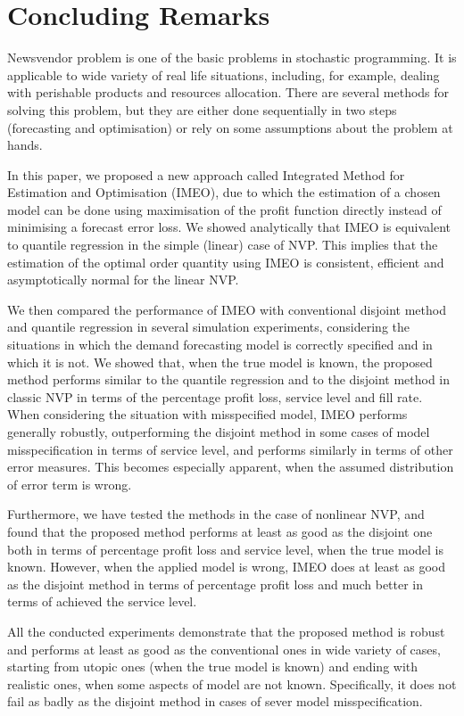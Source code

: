 \documentclass{article}
\begin{document}
\section{Concluding Remarks} \label{se:end}

Newsvendor problem is one of the basic problems in stochastic programming. It is applicable to wide variety of real life situations, including, for example, dealing with perishable products and resources allocation. There are several methods for solving this problem, but they are either done sequentially in two steps (forecasting and optimisation) or rely on some assumptions about the problem at hands.

In this paper, we proposed a new approach called Integrated Method for Estimation and Optimisation (IMEO), due to which the estimation of a chosen model can be done using maximisation of the profit function directly instead of minimising a forecast error loss. We showed analytically that IMEO is equivalent to quantile regression in the simple (linear) case of NVP. This implies that the estimation of the optimal order quantity using IMEO is consistent, efficient and asymptotically normal for the linear NVP.

We then compared the performance of IMEO with conventional disjoint method and quantile regression in several simulation experiments, considering the situations in which the demand forecasting model is correctly specified and in which it is not. We showed that, when the true model is known, the proposed method performs similar to the quantile regression and to the disjoint method in classic NVP in terms of the percentage profit loss, service level and fill rate. When considering the situation with misspecified model, IMEO performs generally robustly, outperforming the disjoint method in some cases of model misspecification in terms of service level, and performs similarly in terms of other error measures. This becomes especially apparent, when the assumed distribution of error term is wrong.

Furthermore, we have tested the methods in the case of nonlinear NVP, and found that the proposed method performs at least as good as the disjoint one both in terms of percentage profit loss and service level, when the true model is known. However, when the applied model is wrong, IMEO does at least as good as the disjoint method in terms of percentage profit loss and much better in terms of achieved the service level.

All the conducted experiments demonstrate that the proposed method is robust and performs at least as good as the conventional ones in wide variety of cases, starting from utopic ones (when the true model is known) and ending with realistic ones, when some aspects of model are not known. Specifically, it does not fail as badly as the disjoint method in cases of sever model misspecification.
\end{document}
